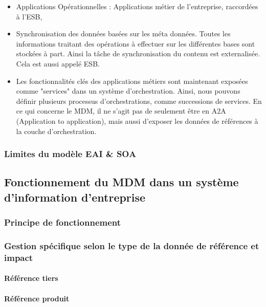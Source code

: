 \begin{itemize}

\item Applications Opérationnelles : Applications métier de l'entreprise, raccordées à l'ESB, 

\item Synchronisation des données basées sur les méta données. Toutes les informations traitant 
des opérations à effectuer sur les différentes bases sont stockées à part. Ainsi la tâche de synchronisation
du contenu est externalisée. Cela est aussi appelé ESB.

\item Les fonctionnalités clés des applications métiers sont maintenant exposées  comme "services" 
dans un système d'orchestration. Ainsi, nous pouvons définir plusieurs processus d'orchestrations, 
comme successions de services. En ce qui concerne le MDM, il ne s'agit pas de seulement être en A2A 
(Application to application), mais aussi d'exposer les données de références à la couche d'orchestration.

\end{itemize}

\subsubsection{Limites du modèle EAI \& SOA}


\subsection{Fonctionnement du MDM dans un système d'information d'entreprise}

\subsubsection{Principe de fonctionnement}

\subsubsection{Gestion spécifique selon le type de la donnée de référence et impact}

\paragraph{Référence tiers}

\paragraph{Référence produit}

